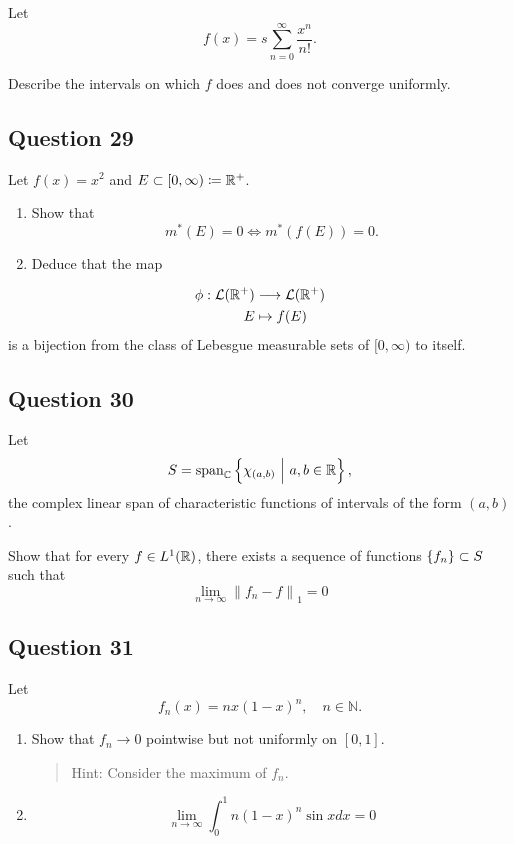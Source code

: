\documentclass[12pt]{article}
\begin{document}
Let \[
f(x) = s \sum_{n=0}^{\infty} \frac{x^{n}}{n !}.
\]

Describe the intervals on which \(f\) does and does not converge
uniformly.

\hypertarget{question-29-1}{%
\subsection{Question 29}\label{question-29-1}}

Let \(f(x) = x^2\) and \(E \subset [0, \infty) \coloneqq {\mathbb{R}}^+\).

\begin{enumerate}
\def\labelenumi{\arabic{enumi}.}
\item
  Show that \[
  m^*(E) = 0 \iff m^*(f(E)) = 0.
  \]
\item
  Deduce that the map
\end{enumerate}

\begin{align*}
\phi: \mathcal{L}({\mathbb{R}}^+) &\longrightarrow \mathcal{L}({\mathbb{R}}^+) \\
E &\mapsto f(E)
\end{align*} is a bijection from the class of Lebesgue measurable sets
of \([0, \infty)\) to itself.

\hypertarget{question-30-1}{%
\subsection{Question 30}\label{question-30-1}}

Let \[
S = {\mathrm{span}}_{\mathbb{C}}\left\{{\chi_{(a, b)} {~\mathrel{\Big|}~} a, b \in {\mathbb{R}}}\right\},
\] the complex linear span of characteristic functions of intervals of
the form \((a, b)\).

Show that for every \(f\in L^1({\mathbb{R}})\), there exists a sequence of
functions \(\left\{{f_n}\right\} \subset S\) such that \[
\lim _{n \rightarrow \infty}\left\|f_{n}-f\right\|_{1}=0
\]

\hypertarget{question-31-1}{%
\subsection{Question 31}\label{question-31-1}}

Let \[
f_{n}(x)=n x(1-x)^{n}, \quad n \in \mathbb{N}.
\]

\begin{enumerate}
\def\labelenumi{\arabic{enumi}.}
\item
  Show that \(f_n \to 0\) pointwise but not uniformly on \([0, 1]\).

  \begin{quote}
  Hint: Consider the maximum of \(f_n\).
  \end{quote}
\item
  \[
  \lim _{n \rightarrow \infty} \int_{0}^{1} n(1-x)^{n} \sin x d x=0
  \]
\end{enumerate}
\end{document}
